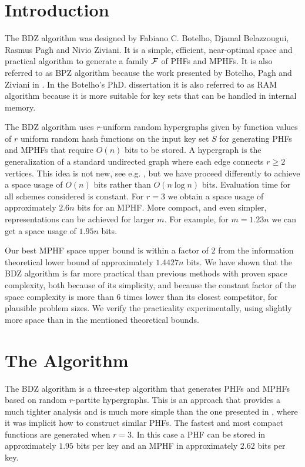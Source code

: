 \section{Introduction} \label{sec:introduction}

The BDZ algorithm was designed by Fabiano C. Botelho, Djamal Belazzougui, Rasmus Pagh and Nivio Ziviani.
It is a simple, efficient, near-optimal space and practical
algorithm to generate a family $\cal F$ of PHFs and MPHFs.
It is also referred to as BPZ algorithm because the work presented
by Botelho, Pagh and Ziviani in \cite{bpz07}.
In the Botelho's PhD. dissertation \cite{b08} it is also referred to as RAM algorithm
because it is more suitable for key sets that can be handled in internal memory.

The BDZ algorithm uses $r$-uniform random hypergraphs
given by function values of $r$
uniform random hash functions on the input key set $S$ for generating PHFs and MPHFs that
require $O(n)$ bits to be stored.
A hypergraph is the generalization of a standard undirected
graph where each edge connects $r\geq 2$ vertices.
This idea is not new, see e.g. \cite{mwhc96},
but we have proceed differently to achieve
a space usage of $O(n)$ bits rather than $O(n\log n)$ bits.
Evaluation time for all schemes considered is constant.
For $r=3$ we obtain a space usage of approximately $2.6n$ bits for
an MPHF. More compact, and even simpler, representations can be
achieved for larger $m$. For example, for $m=1.23n$ we can get a
space usage of $1.95n$ bits.

Our best MPHF space upper bound is within a
factor of 2 from the information theoretical lower bound of approximately
$1.4427n$ bits. We have shown that the BDZ algorithm is far more
practical than previous methods with proven space complexity, both
because of its simplicity, and because the constant factor of the
space complexity is more than 6 times lower than its closest
competitor, for plausible problem sizes. We verify the practicality
experimentally, using slightly more space than in the mentioned
theoretical bounds.

\section{The Algorithm}

The BDZ algorithm is a three-step algorithm that generates PHFs and MPHFs based on
random $r$-partite hypergraphs.
This is an approach that provides a much tighter analysis and is
much more simple than the one presented in
\cite{ckrt04}, where it was implicit how to construct
similar PHFs.
The fastest and most compact functions
are generated when $r=3$.
In this case a PHF can be stored in
approximately $1.95$ bits per key and
an MPHF in approximately
$2.62$ bits per key.

